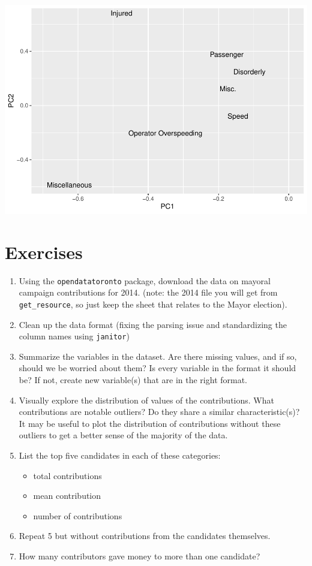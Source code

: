 \documentclass[
]{book}
\providecommand{\tightlist}{%
  \setlength{\itemsep}{0pt}\setlength{\parskip}{0pt}}
\begin{document}
\includegraphics{telling_stories_with_data_files/figure-latex/unnamed-chunk-272-1.pdf}

\hypertarget{exercises}{%
\section{Exercises}\label{exercises}}

\begin{enumerate}
\def\labelenumi{\arabic{enumi}.}
\tightlist
\item
  Using the \texttt{opendatatoronto} package, download the data on mayoral campaign contributions for 2014. (note: the 2014 file you will get from \texttt{get\_resource}, so just keep the sheet that relates to the Mayor election).
\item
  Clean up the data format (fixing the parsing issue and standardizing the column names using \texttt{janitor})
\item
  Summarize the variables in the dataset. Are there missing values, and if so, should we be worried about them? Is every variable in the format it should be? If not, create new variable(s) that are in the right format.
\item
  Visually explore the distribution of values of the contributions. What contributions are notable outliers? Do they share a similar characteristic(s)? It may be useful to plot the distribution of contributions without these outliers to get a better sense of the majority of the data.
\item
  List the top five candidates in each of these categories:

  \begin{itemize}
  \tightlist
  \item
    total contributions
  \item
    mean contribution
  \item
    number of contributions
  \end{itemize}
\item
  Repeat 5 but without contributions from the candidates themselves.
\item
  How many contributors gave money to more than one candidate?
\end{enumerate}
\end{document}
